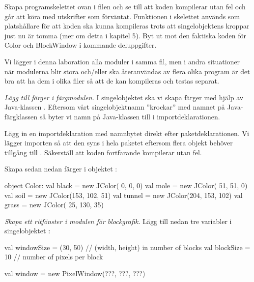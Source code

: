 \noindent Skapa programskelettet ovan i filen  och se till att koden kompilerar utan fel och går att köra med utskrifter som förväntat. Funktionen  i skelettet används som platshållare för att koden ska kunna kompileras trots att singelobjektens kroppar just nu är tomma (mer om detta i kapitel 5).  Byt ut  mot den faktiska koden för Color och BlockWindow i kommande deluppgifter.

Vi lägger i denna laboration alla moduler i samma fil, men i andra situationer när  modulerna blir stora och/eller ska återanvändas av flera olika program är det bra att ha dem i olika filer så att de kan kompileras och testas separat.


\Task \emph{Lägg till färger i färgmodulen.} I singelobjektet  ska vi skapa färger med hjälp av Java-klassen . Eftersom vårt singelobjektnamn ''krockar'' med namnet på Java-färgklassen så byter vi namn på Java-klassen till  i importdeklarationen.

\Subtask
Lägg in en importdeklaration med namnbytet direkt efter paketdeklarationen. Vi lägger importen så att den syns i hela paketet eftersom flera objekt behöver tillgång till . Säkerställ att koden fortfarande kompilerar utan fel.

\Subtask
Skapa sedan nedan färger i objektet :
\begin{Code}
object Color:
  val black  = new JColor(  0,   0,   0)
  val mole   = new JColor( 51,  51,   0)
  val soil   = new JColor(153, 102,  51)
  val tunnel = new JColor(204, 153, 102)
  val grass  = new JColor( 25, 130,  35)
\end{Code}


\Task \emph{Skapa ett ritfönster i modulen för blockgrafik.} Lägg till nedan tre variabler i singelobjektet :

\begin{Code}
  val windowSize = (30, 50)  // (width, height) in number of blocks
  val blockSize  = 10        // number of pixels per block

  val window = new PixelWindow(???, ???, ???)
\end{Code}

